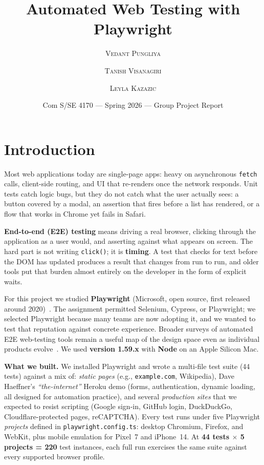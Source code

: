 \documentclass[12pt,letterpaper]{article}
\title{\vspace{-0.4in}\textbf{Automated Web Testing with Playwright}}
\author{%
  \textsc{Vedant Pungliya} 
  \and
  \textsc{Tanish Visanagiri} 
  \and
  \textsc{Leyla Kazazic}
}
\date{Com S/SE 4170 --- Spring 2026 --- Group Project Report}
\newcommand{\code}[1]{\texttt{#1}}
\begin{document}
\maketitle
\thispagestyle{empty}

\section{Introduction}

Most web applications today are single-page apps: heavy on asynchronous \code{fetch} calls, client-side routing, and UI that re-renders once the network responds. Unit tests catch logic bugs, but they do not catch what the user actually sees: a button covered by a modal, an assertion that fires before a list has rendered, or a flow that works in Chrome yet fails in Safari.

\textbf{End-to-end (E2E) testing} means driving a real browser, clicking through the application as a user would, and asserting against what appears on screen. The hard part is not writing \code{click()}; it is \textbf{timing}. A test that checks for text before the DOM has updated produces a result that changes from run to run, and older tools put that burden almost entirely on the developer in the form of explicit waits.

For this project we studied \textbf{Playwright} (Microsoft, open source, first released around 2020)~\cite{wikiplaywright}. The assignment permitted Selenium, Cypress, or Playwright; we selected Playwright because many teams are now adopting it, and we wanted to test that reputation against concrete experience. Broader surveys of automated E2E web-testing tools remain a useful map of the design space even as individual products evolve~\cite{leotta}. We used \textbf{version 1.59.x} with \textbf{Node} on an Apple Silicon Mac.

\textbf{What we built.} We installed Playwright and wrote a multi-file test suite (44 tests) against a mix of: \emph{static pages} (e.g., \code{example.com}, Wikipedia), Dave Haeffner's \emph{``the-internet''} Heroku demo (forms, authentication, dynamic loading, all designed for automation practice), and several \emph{production sites} that we expected to resist scripting (Google sign-in, GitHub login, DuckDuckGo, Cloudflare-protected pages, reCAPTCHA). Every test runs under five Playwright \emph{projects} defined in \code{playwright.config.ts}: desktop Chromium, Firefox, and WebKit, plus mobile emulation for Pixel~7 and iPhone~14. At \textbf{44 tests $\times$ 5 projects = 220} test instances, each full run exercises the same suite against every supported browser profile.
\end{document}
